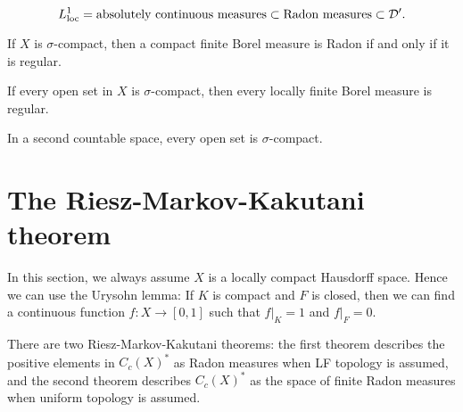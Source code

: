 \documentclass{../crs}
\begin{document}
\begin{center}
\end{center}

\[L_{\text{loc}}^1=\text{absolutely continuous measures}\subset\text{Radon measures}\subset\mathcal{D}'.\]

\begin{cor}
If $X$ is $\sigma$-compact, then a compact finite Borel measure is Radon if and only if it is regular.
\end{cor}

\begin{thm}
If every open set in $X$ is $\sigma$-compact, then every locally finite Borel measure is regular.
\end{thm}
\begin{prop}
In a second countable space, every open set is $\sigma$-compact.
\end{prop}




\section{The Riesz-Markov-Kakutani theorem}
In this section, we always assume $X$ is a locally compact Hausdorff space.
Hence we can use the Urysohn lemma: If $K$ is compact and $F$ is closed, then we can find a continuous function $f:X\to[0,1]$ such that $f|_K=1$ and $f|_F=0$.

There are two Riesz-Markov-Kakutani theorems: the first theorem describes the positive elements in $C_c(X)^*$ as Radon measures when LF topology is assumed, and the second theorem describes $C_c(X)^*$ as the space of finite Radon measures when uniform topology is assumed.
\end{document}
